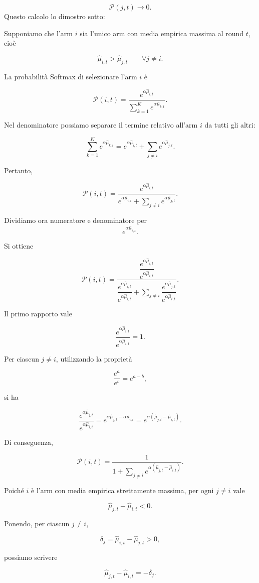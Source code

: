 \[
\mathcal{P}(j,t)\to 0.
\]
Questo calcolo lo dimostro sotto:
\begin{observation}{}
Supponiamo che l'arm $i$ sia l'unico arm con media empirica massima al round $t$, cioè

\[
\widehat{\mu}_{i,t}
>
\widehat{\mu}_{j,t}
\qquad
\forall j\neq i.
\]

La probabilità Softmax di selezionare l'arm $i$ è

\[
\mathcal{P}(i,t)
=
\frac{
e^{\alpha\widehat{\mu}_{i,t}}
}{
\sum_{k=1}^{K}e^{\alpha\widehat{\mu}_{k,t}}
}.
\]

Nel denominatore possiamo separare il termine relativo all'arm $i$ da tutti gli altri:

\[
\sum_{k=1}^{K}e^{\alpha\widehat{\mu}_{k,t}}
=
e^{\alpha\widehat{\mu}_{i,t}}
+
\sum_{j\neq i}
e^{\alpha\widehat{\mu}_{j,t}}.
\]

Pertanto,

\[
\mathcal{P}(i,t)
=
\frac{
e^{\alpha\widehat{\mu}_{i,t}}
}{
e^{\alpha\widehat{\mu}_{i,t}}
+
\sum_{j\neq i}
e^{\alpha\widehat{\mu}_{j,t}}
}.
\]

Dividiamo ora numeratore e denominatore per
\[
e^{\alpha\widehat{\mu}_{i,t}}.
\]

Si ottiene

\[
\mathcal{P}(i,t)
=
\frac{
\dfrac{e^{\alpha\widehat{\mu}_{i,t}}}
{e^{\alpha\widehat{\mu}_{i,t}}}
}{
\dfrac{e^{\alpha\widehat{\mu}_{i,t}}}
{e^{\alpha\widehat{\mu}_{i,t}}}
+
\sum_{j\neq i}
\dfrac{
e^{\alpha\widehat{\mu}_{j,t}}
}{
e^{\alpha\widehat{\mu}_{i,t}}
}
}.
\]

Il primo rapporto vale

\[
\frac{
e^{\alpha\widehat{\mu}_{i,t}}
}{
e^{\alpha\widehat{\mu}_{i,t}}
}
=1.
\]

Per ciascun $j\neq i$, utilizzando la proprietà

\[
\frac{e^a}{e^b}=e^{a-b},
\]

si ha

\[
\frac{
e^{\alpha\widehat{\mu}_{j,t}}
}{
e^{\alpha\widehat{\mu}_{i,t}}
}
=
e^{
\alpha\widehat{\mu}_{j,t}
-
\alpha\widehat{\mu}_{i,t}
}
=
e^{
\alpha
\left(
\widehat{\mu}_{j,t}
-
\widehat{\mu}_{i,t}
\right)
}.
\]

Di conseguenza,

\[
\mathcal{P}(i,t)
=
\frac{
1
}{
1+
\sum_{j\neq i}
e^{
\alpha
\left(
\widehat{\mu}_{j,t}
-
\widehat{\mu}_{i,t}
\right)
}
}.
\]

Poiché $i$ è l'arm con media empirica strettamente massima, per ogni $j\neq i$ vale

\[
\widehat{\mu}_{j,t}
-
\widehat{\mu}_{i,t}
<0.
\]

Ponendo, per ciascun $j\neq i$,

\[
\delta_j
=
\widehat{\mu}_{i,t}
-
\widehat{\mu}_{j,t}
>0,
\]

possiamo scrivere

\[
\widehat{\mu}_{j,t}
-
\widehat{\mu}_{i,t}
=
-\delta_j.
\]
\end{observation}

